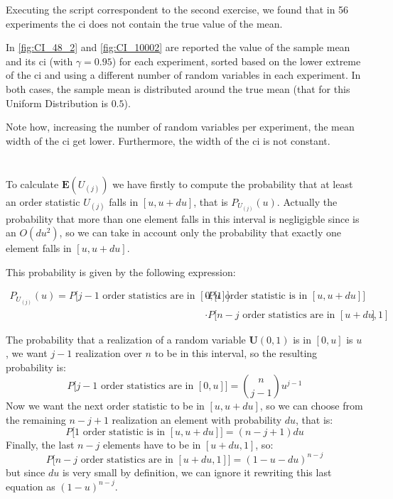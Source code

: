 \documentclass[11pt,a4paper]{article}
\begin{document}
Executing the script correspondent to the second exercise, we found that in 56 experiments the \gls{ci} does not contain the true value of the mean.

In \autoref{fig:CI_48_2} and \autoref{fig:CI_10002} are reported the value of the sample mean and its \gls{ci} (with $\gamma=0.95$) for each experiment, sorted based on the lower extreme of the \gls{ci} and using a different number of random variables in each experiment.
In both cases, the sample mean is distributed around the true mean (that for this Uniform Distribution is $0.5$).

Note how, increasing the number of random variables per experiment, the mean width of the \gls{ci} get lower. Furthermore, the width of the \gls{ci} is not constant.

\section{}

To calculate $\mathbf{E}(U_{(j)})$ we have firstly to compute the probability that at least an order statistic $U_{(j)}$ falls in $[u, u+du]$, that is $P_{U_{(j)}}(u)$. Actually the probability that more than one element falls in this interval is negligigble since is an $O(du^2)$, so we can take in account only the probability that exactly one element falls in $[u, u+du]$.

This probability is given by the following expression:

\begin{equation}\label{eq:p(u)}
  \begin{split}
    P_{U_{(j)}}(u) = P\bigg[\text{$j-1$ order statistics are in $[0, u]$}\bigg] &\cdot P\bigg[\text{1 order statistic is in $[u, u+du]$}\bigg] \\&\cdot P\bigg[\text{$n-j$ order statistics are in $[u+du, 1]$}\bigg]
  \end{split}
\end{equation}

The probability that a realization of a random variable $\mathbf{U}(0,1)$ is in $[0, u]$ is $u$, we want $j-1$ realization over $n$ to be in this interval, so the resulting probability is:
$$
P\bigg[\text{$j-1$ order statistics are in $[0, u]$}\bigg] = \binom{n}{j-1}u^{j-1}
$$
Now we want the next order statistic to be in $[u, u+du]$, so we can choose from the remaining $n-j+1$ realization an element with probability $du$, that is:
$$ P\bigg[\text{1 order statistic is in $[u, u+du]$}\bigg] = (n-j+1)du$$
Finally, the last $n-j$ elements have to be in $[u+du,1]$, so:
$$ P\bigg[\text{$n-j$ order statistics are in $[u+du, 1]$}\bigg] = (1-u-du)^{n-j} $$
but since $du$ is very small by definition, we can ignore it rewriting this last equation as $(1-u)^{n-j}$.
\end{document}
